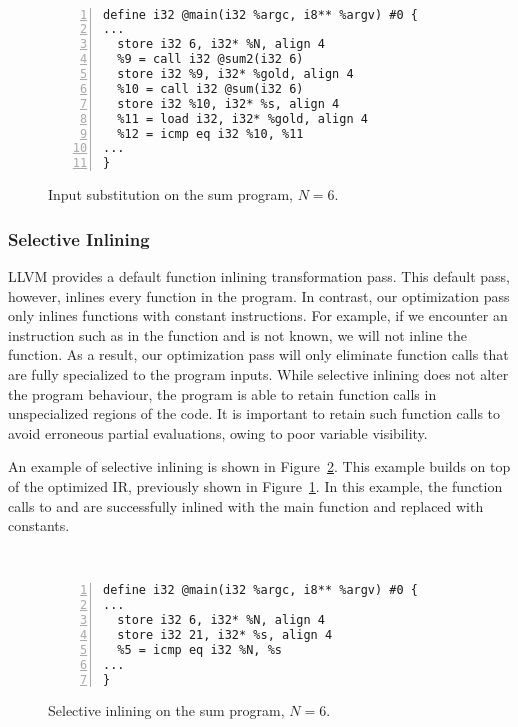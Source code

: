\begin{figure}[htbp]\
\begin{Verbatim}[frame=single,fontsize={\scriptsize},numbers=left,numbersep=5pt,xleftmargin=10pt]
define i32 @main(i32 %argc, i8** %argv) #0 {
...
  store i32 6, i32* %N, align 4
  %9 = call i32 @sum2(i32 6)
  store i32 %9, i32* %gold, align 4
  %10 = call i32 @sum(i32 6)
  store i32 %10, i32* %s, align 4
  %11 = load i32, i32* %gold, align 4
  %12 = icmp eq i32 %10, %11
...
}
\end{Verbatim}
\caption{Input substitution on the sum program, $N=6$.}
\label{fig:input_sub_ir}
\end{figure}

\bigbreak

\subsubsection{Selective Inlining}

LLVM provides a default function inlining transformation pass.
This default pass, however, inlines every function in the program.
In contrast, our optimization pass only inlines functions with constant instructions.
For example, if we encounter an instruction such as \inlinecode{\%x = add i32 1, \%y} in the function and  is not known, we will not inline the function.
As a result, our optimization pass will only eliminate function calls that are fully specialized to the program inputs.
While selective inlining does not alter the program behaviour, the program is able to retain function calls in unspecialized regions of the code.
It is important to retain such function calls to avoid erroneous partial evaluations, owing to poor variable visibility.

An example of selective inlining is shown in Figure~\ref{fig:inlining_ir}.
This example builds on top of the optimized IR, previously shown in Figure~\ref{fig:input_sub_ir}.
In this example, the function calls to \inlinecode{sum2()} and \inlinecode{sum()} are successfully inlined with the main function and replaced with constants.

\begin{figure}[htbp]\
\begin{Verbatim}[frame=single,fontsize={\scriptsize},numbers=left,numbersep=5pt,xleftmargin=10pt]
define i32 @main(i32 %argc, i8** %argv) #0 {
...
  store i32 6, i32* %N, align 4
  store i32 21, i32* %s, align 4
  %5 = icmp eq i32 %N, %s
...
}
\end{Verbatim}
\caption{Selective inlining on the sum program, $N=6$.}
\label{fig:inlining_ir}
\end{figure}
